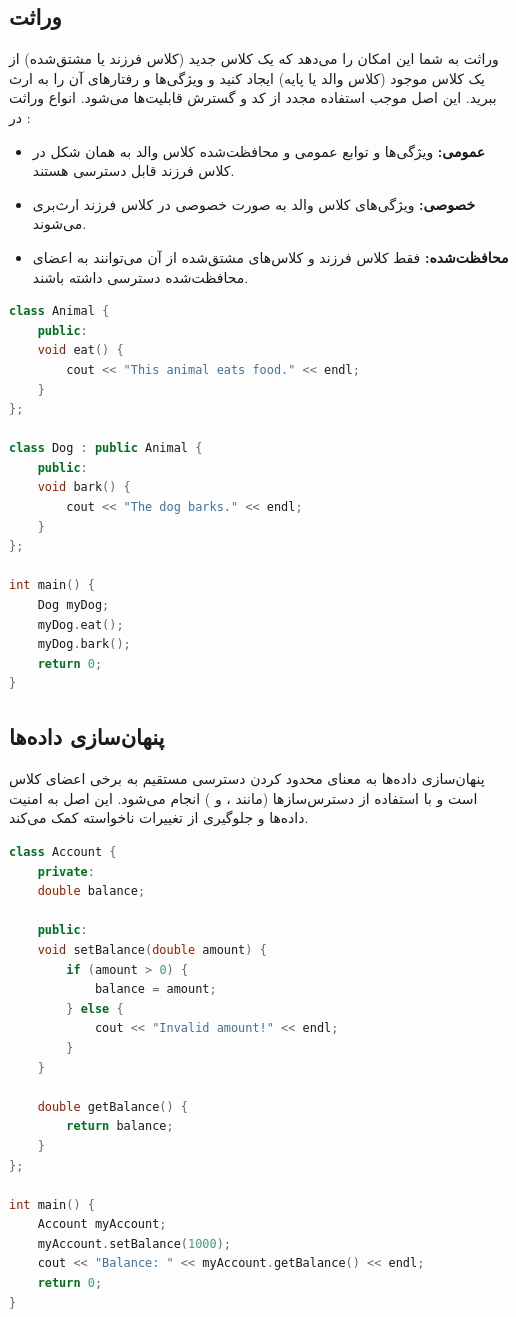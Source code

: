 \documentclass[12pt, a4paper]{report}
\begin{document}
\subsection{وراثت}
وراثت به شما این امکان را می‌دهد که یک کلاس جدید (کلاس فرزند یا مشتق‌شده) از یک کلاس موجود (کلاس والد یا پایه) ایجاد کنید و ویژگی‌ها و رفتارهای آن را به ارث ببرید. این اصل موجب استفاده مجدد از کد و گسترش قابلیت‌ها می‌شود.
انواع وراثت در :
\begin{itemize}
	\item \textbf{عمومی:} ویژگی‌ها و توابع عمومی و محافظت‌شده کلاس والد به همان شکل در کلاس فرزند قابل دسترسی هستند.
	\item \textbf{خصوصی:} ویژگی‌های کلاس والد به صورت خصوصی در کلاس فرزند ارث‌بری می‌شوند.
	\item \textbf{محافظت‌شده:} فقط کلاس فرزند و کلاس‌های مشتق‌شده از آن می‌توانند به اعضای محافظت‌شده دسترسی داشته باشند.
\end{itemize}
\LTR
\begin{lstlisting}[language=C++, breaklines=true]
class Animal {
	public:
	void eat() {
		cout << "This animal eats food." << endl;
	}
};

class Dog : public Animal {
	public:
	void bark() {
		cout << "The dog barks." << endl;
	}
};

int main() {
	Dog myDog;
	myDog.eat();  
	myDog.bark(); 
	return 0;
}
\end{lstlisting}
\RTL
 \subsection{پنهان‌سازی داده‌ها}
 پنهان‌سازی داده‌ها به معنای محدود کردن دسترسی مستقیم به برخی اعضای کلاس است و با استفاده از دسترس‌سازها (مانند ،  و ) انجام می‌شود. این اصل به امنیت داده‌ها و جلوگیری از تغییرات ناخواسته کمک می‌کند.

\LTR
\begin{lstlisting}[language=C++, breaklines=true]
class Account {
	private:
	double balance;
	
	public:
	void setBalance(double amount) {
		if (amount > 0) {
			balance = amount;
		} else {
			cout << "Invalid amount!" << endl;
		}
	}
	
	double getBalance() {
		return balance;
	}
};

int main() {
	Account myAccount;
	myAccount.setBalance(1000); 
	cout << "Balance: " << myAccount.getBalance() << endl;
	return 0;
}

\end{lstlisting}
\RTL
\end{document}
